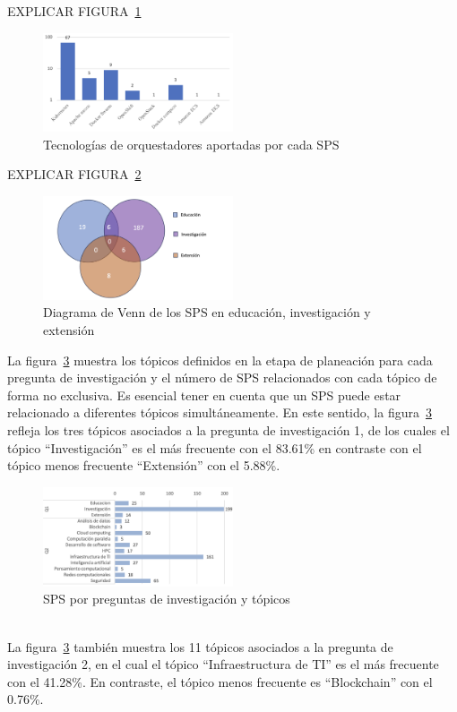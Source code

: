 EXPLICAR FIGURA~\ref{fig:SPS-ORCH}
\begin{figure}[htbp]
    \centering
    \includegraphics[width=0.5\textwidth]{resources/images/resultados/orch-SPS.png}
    \caption{Tecnologías de orquestadores aportadas por cada SPS}\label{fig:SPS-ORCH}
\end{figure}

EXPLICAR FIGURA~\ref{fig:SPS-venn}
\begin{figure}[htbp]
    \centering
    \includegraphics[width=0.5\textwidth]{resources/images/resultados/SPS-venn.png}
    \caption{Diagrama de Venn de los SPS en educación, investigación y extensión}\label{fig:SPS-venn}
\end{figure}

La figura~\ref{fig:SPS-topics} muestra los tópicos definidos en la etapa de planeación para cada pregunta de investigación y el número de SPS relacionados con cada tópico de forma no exclusiva. Es esencial tener en cuenta que un SPS puede estar relacionado a diferentes tópicos simultáneamente. En este sentido, la figura~\ref{fig:SPS-topics} refleja los tres tópicos asociados a la pregunta de investigación 1, de los cuales el tópico ``Investigación'' es el más frecuente con el 83.61\% en contraste con el tópico menos frecuente ``Extensión'' con el 5.88\%.
\begin{figure}[htbp]
    \centering
    \includegraphics[width=0.5\textwidth]{resources/images/resultados/SPS-topics.png}
    \caption{SPS por preguntas de investigación y tópicos}\label{fig:SPS-topics}
\end{figure}
\mbox{}\\
La figura~\ref{fig:SPS-topics} también muestra los 11 tópicos asociados a la pregunta de investigación 2, en el cual el tópico ``Infraestructura de TI'' es el más frecuente con el  41.28\%. En contraste, el tópico menos frecuente es ``Blockchain'' con el 0.76\%.\\ 

